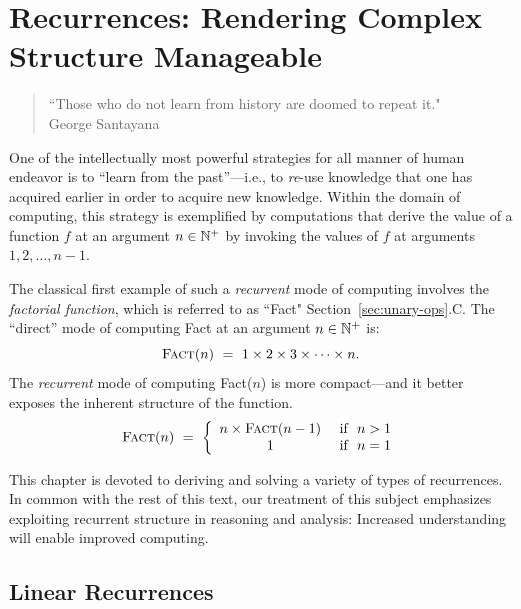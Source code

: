 
\chapter{Recurrences:
Rendering Complex Structure Manageable}
\label{ch:Recurrences}

\begin{quote}
``Those who do not learn from history are doomed to repeat it." \\
\hspace*{1in}George Santayana
\end{quote}

\bigskip

\noindent
One of the intellectually most powerful strategies for all manner of human endeavor is to ``learn from the past''---i.e., to {\em re}-use knowledge that one has acquired earlier in order to acquire new knowledge.  Within the domain of computing, this strategy is exemplified by computations that derive the value of a function $f$ at an argument $n \in \mathbb{N}^+$ by invoking the values of $f$ at arguments $1, 2, \ldots, n-1$.

\smallskip

The classical first example of such a {\it recurrent} mode of computing involves the {\it factorial function}, which is referred to as ``{\sc Fact}" Section~\ref{sec:unary-ops}.C.  The ``direct'' mode of computing {\sc Fact} at an argument $n \in \mathbb{N}^+$ is:
\[ \mbox{\sc Fact}(n) \ = \ 1 \times 2 \times 3 \times \cdots \times n. \]
The {\em recurrent} mode of computing {\sc Fact}($n$) is more compact---and it better exposes the inherent structure of the function.
\[ \mbox{\sc Fact}(n) \ = \ \left\{
\begin{array}{cl}
 n \times \mbox{\sc Fact}(n-1) & \mbox{ if } \ n > 1 \\
 1 & \mbox{ if } \ n = 1 \\
\end{array}
\right.
\]

\smallskip

This chapter is devoted to deriving and solving a variety of types of recurrences.  In common with the rest of this text, our treatment of this subject emphasizes exploiting recurrent structure in reasoning and analysis: Increased understanding will enable improved computing.


\section{Linear Recurrences}
\label{sec:linear-recurrences}

